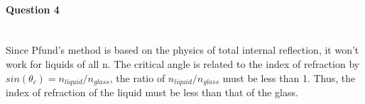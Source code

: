 \documentclass[12pt]{article}
\begin{document}
\paragraph{Question 4} \mbox{}\\
Since Pfund's method is based on the physics of total internal reflection, it won't work for liquids of all n. The critical angle is related to the index of refraction by $sin(\theta_c) = n_{liquid}/n_{glass}$, the ratio of $n_{liquid}/n_{glass}$ must be less than 1. Thus, the index of refraction of the liquid must be less than that of the glass.
\end{document}
